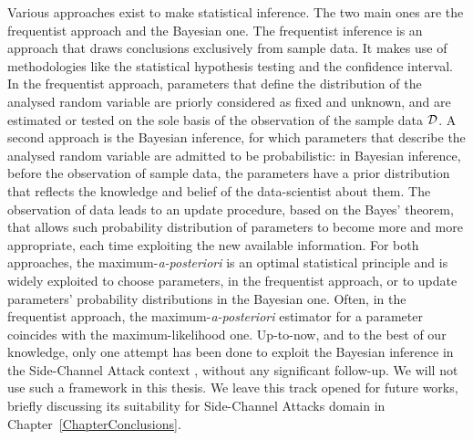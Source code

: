 Various approaches exist to make statistical inference. The two main ones are the frequentist approach and the Bayesian one. The frequentist inference is an approach that draws conclusions exclusively from sample data. It makes use of methodologies like the statistical hypothesis testing and the confidence interval. In the frequentist approach, parameters that define the distribution of the analysed random variable are priorly considered as fixed and unknown, and are estimated or tested on the sole basis of the observation of the sample data $\mathcal{D}$. A second approach is the Bayesian inference, for which parameters that describe the analysed random variable are admitted to be probabilistic: in Bayesian inference, before the observation of sample data, the parameters have a prior distribution that reflects the knowledge and belief of the data-scientist about them. The observation of data leads to an update procedure, based on the Bayes' theorem, that allows such probability distribution of parameters to become more and more appropriate, each time exploiting the new available information. For both approaches, the maximum-\textit{a-posteriori} is an optimal statistical principle and is widely exploited to choose parameters, in the frequentist approach, or to update parameters' probability distributions in the Bayesian one. Often, in the frequentist approach, the maximum-\textit{a-posteriori} estimator for a parameter coincides with the maximum-likelihood one. Up-to-now, and to the best of our knowledge, only one attempt has been done to exploit the Bayesian inference in the Side-Channel Attack context \cite{pautot2008some}, without any significant follow-up. We will not use such a framework in this thesis. We leave this track opened for future works, briefly discussing its suitability for Side-Channel Attacks domain in Chapter~\ref{ChapterConclusions}.

